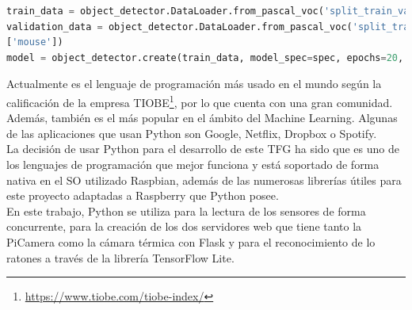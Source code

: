 \begin{code}[h]
\begin{lstlisting}[language=Python]
train_data = object_detector.DataLoader.from_pascal_voc('split_train_validate/train', 'split_train_validate/train', ['mouse'])
validation_data = object_detector.DataLoader.from_pascal_voc('split_train_validate/validate', 'split_train_validate/validate', 
['mouse'])
model = object_detector.create(train_data, model_spec=spec, epochs=20, batch_size=8, train_whole_model=True, validation_data=validation_data)
\end{lstlisting}
\caption[Código para generar un modelo de detección de ratones en Python]{Código para generar un modelo de detección de ratones en Python}
\label{cod:pythonML}
\end{code}

Actualmente es el lenguaje de programación más usado en el mundo según la calificación de la empresa TIOBE\footnote{\url{https://www.tiobe.com/tiobe-index/}}, por lo que cuenta con una gran comunidad. Además, también es el más popular en el ámbito del Machine Learning. Algunas de las aplicaciones que usan Python son Google, Netflix, Dropbox o Spotify.\\

La decisión de usar Python para el desarrollo de este TFG ha sido que es uno de los lenguajes de programación que mejor funciona y está soportado de forma nativa en el SO utilizado Raspbian, además de las numerosas librerías útiles para este proyecto adaptadas a Raspberry que Python posee.\\

En este trabajo, Python se utiliza para la lectura de los sensores de forma concurrente, para la creación de los dos servidores web que tiene tanto la PiCamera como la cámara térmica con Flask y para el reconocimiento de lo ratones a través de la librería TensorFlow Lite.\\

